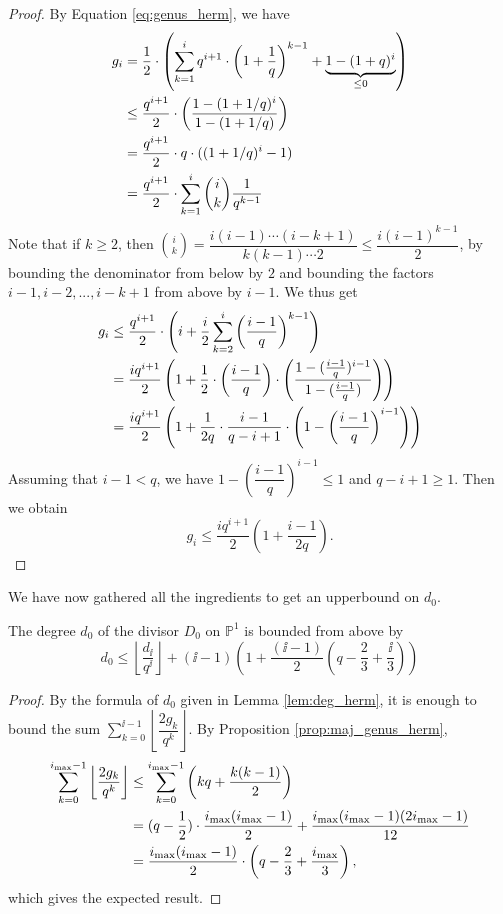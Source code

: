 \documentclass[10pt]{article}
\begin{document}
\begin{proof}
By Equation  \eqref{eq:genus_herm}, we have
\begin{align*}
g_i  &=\dfrac{1}{2} \cdot \left(\sum\limits_{k=1}^i q^{i+1} \cdot \left(1+\frac{1}{q}\right)^{k-1} +\underbrace{1 -(1+q)^i}_{\leq 0}\right) \\
	&\leq \dfrac{q^{i+1}}{2} \cdot \left(\dfrac{1-(1+1/q)^i}{1-(1+1/q)}\right) \\
	& = \dfrac{q^{i+1}}{2} \cdot q \cdot ((1+1/q)^i-1) \\
	& = \dfrac{q^{i+1}}{2} \cdot \sum\limits_{k=1}^i \binom{i}{k} \dfrac{1}{q^{k-1}}
\end{align*}
Note that if $k \geq 2$, then $\binom{i}{k} = \dfrac{i(i-1) \cdots (i-k+1)}{k(k-1) \cdots 2} \leq \dfrac{i(i-1)^{k-1}}{2}$, by bounding the denominator from below by $2$ and bounding the factors $i-1,i-2,...,i-k+1$ from above by $i-1$. We thus get
\begin{align*}
g_i &\leq \dfrac{q^{i+1}}{2} \cdot \left( i + \frac{i}{2} \sum\limits_{k=2}^i \left(\dfrac{i-1}{q}\right)^{k-1}\right) \\
	&= \dfrac{iq^{i+1}}{2} \left( 1 + \frac{1}{2} \cdot \left(\frac{i-1}{q}\right) \cdot \left(\dfrac{1-(\frac{i-1}{q})^{i-1}}{1-(\frac{i-1}{q})}\right)\right) \\
		&= \dfrac{iq^{i+1}}{2} \left( 1 + \frac{1}{2q} \cdot \dfrac{i-1}{q-i+1} \cdot \left(1- \left(\dfrac{i-1}{q}\right)^{i-1}\right)\right)\end{align*}
Assuming that $i-1 < q$, we have $1- \left(\dfrac{i-1}{q}\right)^{i-1} \leq 1$ and $q-i+1 \geq 1$. Then we obtain 	
	\[g_i \leq \dfrac{iq^{i+1}}{2} \left( 1 + \frac{i-1}{2q}\right).\]
\end{proof}

We have now gathered all the ingredients to get an upperbound on $d_0$.

\begin{corollary}
The degree $d_0$ of the divisor $D_0$ on $\mathbb{P}^1$ is bounded from above by 
\[d_0 \leq \left\lfloor \dfrac{d_{\ii}}{q^{\ii}}\right\rfloor + (\ii-1)\left( 1+\dfrac{(\ii-1)}{2} \left(q-\frac{2}{3} + \frac{\ii}{3}\right) \right) \]
\end{corollary}

\begin{proof}
	By the formula of $d_0$ given in Lemma \ref{lem:deg_herm}, it is enough to bound the sum $\sum\limits_{k=0}^{\ii-1} \left\lfloor \dfrac{2g_k}{q^k}\right\rfloor$. By Proposition \ref{prop:maj_genus_herm},
\begin{align*}
\sum\limits_{k=0}^{i_{\rm{max}}-1} \left\lfloor \dfrac{2g_k}{q^k}\right\rfloor & \leq  \sum\limits_{k=0}^{i_{\rm{max}}-1} \left(kq + \dfrac{k(k-1)}{2}\right)  \\
	&= (q-\frac{1}{2}) \cdot \dfrac{i_{\rm{max}}(i_{\rm{max}}-1)}{2} + \dfrac{i_{\rm{max}}(i_{\rm{max}}-1)(2i_{\rm{max}}-1)}{12} \\
	&= \dfrac{i_{\rm{max}}(i_{\rm{max}}-1)}{2}\cdot \left(q-\frac{2}{3} + \frac{i_{\rm{max}}}{3}\right),
\end{align*}
which gives the expected result.
\end{proof}
\end{document}
